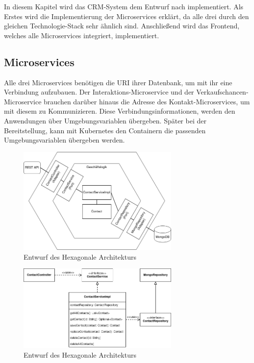 In diesem Kapitel wird das CRM-System dem Entwurf nach implementiert. Als Erstes wird die Implementierung der Microservices erklärt, da alle drei durch den gleichen Technologie-Stack sehr ähnlich sind. Anschließend wird das Frontend, welches alle Microservices integriert, implementiert.

\subsection{Microservices}

Alle drei Microservices benötigen die \ac{URI} ihrer Datenbank, um mit ihr eine Verbindung aufzubauen. Der Interaktions-Microservice und der Verkaufschancen-Microservice brauchen darüber hinaus die Adresse des Kontakt-Microservices, um mit diesem zu Kommunizieren. Diese Verbindungsinformationen, werden den Anwendungen über Umgebungsvariablen übergeben. Später bei der Bereitstellung, kann mit Kubernetes den Containern die passenden Umgebungsvariablen übergeben werden.

\begin{figure}[H] 
    \centering
    \includegraphics[width=0.71\textwidth]{figures/HexagonalDesign.png}
    \caption{Entwurf des \acp{Hexagonale Architektur}}
    \label{fig:CRMENTWURF}
\end{figure}

\begin{figure}[H] 
    \centering
    \includegraphics[width=0.71\textwidth]{figures/UMLKlassenDiagram.png}
    \caption{Entwurf des \acp{Hexagonale Architektur}}
    \label{fig:CRMENTWURF}
\end{figure}


